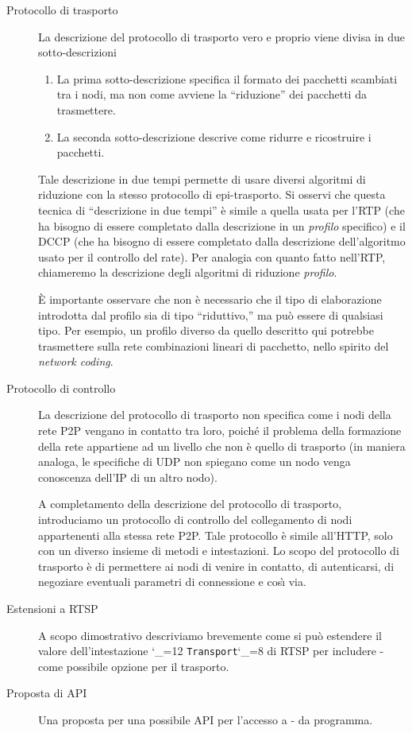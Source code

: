 \documentclass{rfc}
\def\ttt{\catcode`\_=12 \tttii}
\def\tttii#1!{{\tt #1}\catcode`\_=8{}}
\begin{document}
\begin{description}
\item[Protocollo di trasporto] La descrizione del protocollo di
  trasporto vero e   proprio viene divisa in due sotto-descrizioni
\begin{enumerate}
  \item
    La prima sotto-descrizione specifica il formato dei pacchetti
    scambiati tra i nodi, ma  non come avviene la ``riduzione'' dei
    pacchetti da trasmettere.  
  \item
    La seconda sotto-descrizione descrive come 
    ridurre e ricostruire i pacchetti.
\end{enumerate}
Tale descrizione in due tempi permette di usare diversi algoritmi di
riduzione con la stesso protocollo di epi-trasporto.  Si osservi che
questa tecnica di ``descrizione in due tempi'' \`e simile a quella
usata per l'RTP \cite{rfc3550} (che ha bisogno di essere completato
dalla descrizione in un \emph{profilo} specifico) e il DCCP
\cite{rfc4336} (che ha bisogno di essere completato dalla descrizione
dell'algoritmo usato per il controllo del rate). 
Per analogia con quanto fatto nell'RTP, chiameremo la descrizione
degli algoritmi di riduzione \emph{profilo}.

\`E importante osservare che non \`e necessario che il tipo di
elaborazione introdotta dal profilo sia di tipo ``riduttivo,'' ma
pu\`o essere di qualsiasi tipo.  Per esempio, un profilo diverso da
quello descritto qui potrebbe trasmettere sulla rete combinazioni
lineari di pacchetto, nello spirito del  \emph{network coding}.

\item[Protocollo di controllo] La descrizione del protocollo di
trasporto non specifica come i nodi della rete P2P vengano in contatto
tra loro, poich\'e il problema della formazione della rete appartiene
ad un livello che non \`e quello di trasporto (in maniera analoga, le
specifiche di UDP non spiegano come un nodo venga conoscenza dell'IP
di un altro nodo).

A completamento della descrizione del protocollo di trasporto,
introduciamo un protocollo di controllo del collegamento di nodi
appartenenti alla stessa rete P2P.  Tale protocollo \`e simile
all'HTTP, solo con un diverso insieme di metodi e intestazioni.  Lo
scopo del protocollo di trasporto \`e di permettere ai nodi di venire
in contatto, di autenticarsi, di negoziare eventuali parametri di
connessione e cos\`\i{} via.
\item[Estensioni a RTSP] A scopo dimostrativo descriviamo brevemente
  come si pu\`o estendere il valore dell'intestazione \ttt Transport!
  di RTSP per includere \ppetp- come possibile opzione per il
  trasporto.
\item[Proposta di API]  Una proposta per una possibile API per
  l'accesso a \ppetp- da programma.
\end{description}
%
\end{document}
